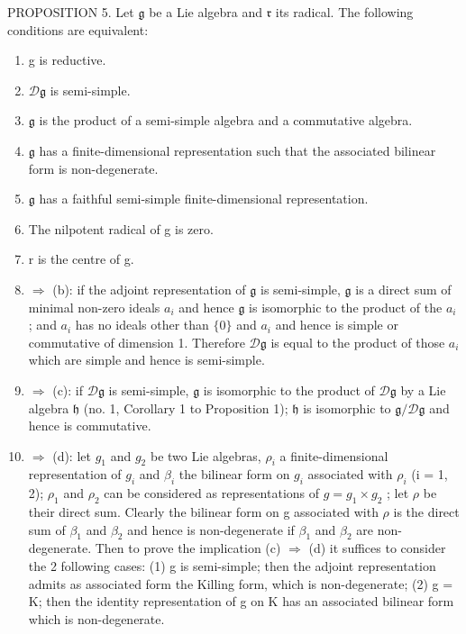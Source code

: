 PROPOSITION 5. Let \(\mathfrak{g}\) be a Lie algebra and \(\mathfrak{r}\) its radical. The following conditions are equivalent:

\begin{enumerate}
\def\labelenumi{(\alph{enumi})}
\item
  g is reductive.
\item
  \(\mathcal{D}\mathfrak{g}\) is semi-simple.
\item
  \(\mathfrak{g}\) is the product of a semi-simple algebra and a commutative algebra.
\item
  \(\mathfrak{g}\) has a finite-dimensional representation such that the associated bilinear form is non-degenerate.
\item
  \(\mathfrak{g}\) has a faithful semi-simple finite-dimensional representation.
\item
  The nilpotent radical of g is zero.
\item
  r is the centre of g.
\item
  \(\Rightarrow\) (b): if the adjoint representation of \(\mathfrak{g}\) is semi-simple, \(\mathfrak{g}\) is a direct sum of minimal non-zero ideals \(a_{i}\) and hence \(\mathfrak{g}\) is isomorphic to the product of the \(a_{i}\) ; and \(a_{i}\) has no ideals other than \(\{0\}\) and \(a_{i}\) and hence is simple or commutative of dimension 1. Therefore \(\mathcal{D}\mathfrak{g}\) is equal to the product of those \(a_{i}\) which are simple and hence is semi-simple.
\item
  \(\Rightarrow\) (c): if \(\mathcal{D}\mathfrak{g}\) is semi-simple, \(\mathfrak{g}\) is isomorphic to the product of \(\mathcal{D}\mathfrak{g}\) by a Lie algebra \(\mathfrak{h}\) (no. 1, Corollary 1 to Proposition 1); \(\mathfrak{h}\) is isomorphic to \(\mathfrak{g}/\mathcal{D}\mathfrak{g}\) and hence is commutative.
\item
  \(\Rightarrow\) (d): let \(g_{1}\) and \(g_{2}\) be two Lie algebras, \(\rho_{i}\) a finite-dimensional representation of \(g_{i}\) and \(\beta_{i}\) the bilinear form on \(g_{i}\) associated with \(\rho_{i}\) (i = 1, 2); \(\rho_{1}\) and \(\rho_{2}\) can be considered as representations of \(g = g_{1} \times g_{2}\) ; let \(\rho\) be their direct sum. Clearly the bilinear form on g associated with \(\rho\) is the direct sum of \(\beta_{1}\) and \(\beta_{2}\) and hence is non-degenerate if \(\beta_{1}\) and \(\beta_{2}\) are non-degenerate. Then to prove the implication (c) \(\Rightarrow\) (d) it suffices to consider the 2 following cases: (1) g is semi-simple; then the adjoint representation admits as associated form the Killing form, which is non-degenerate; (2) g = K; then the identity representation of g on K has an associated bilinear form which is non-degenerate.
\end{enumerate}

